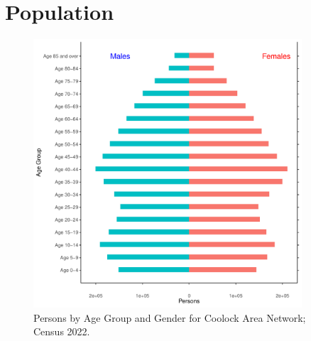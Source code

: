 \documentclass{article}
\begin{document}
\pagebreak

\section{Population} 
\label{sect:Pop}

\begin{figure}[h]
	\centering
	\includegraphics[width = 100mm]{../figures/PyramidPlot.pdf}
	\caption{Persons by Age Group and Gender for Coolock Area Network; Census 2022.}
	\label{fig:2ae19629-1a6a-13a3-e055-000000000001}
	\end{figure}
\end{document}
